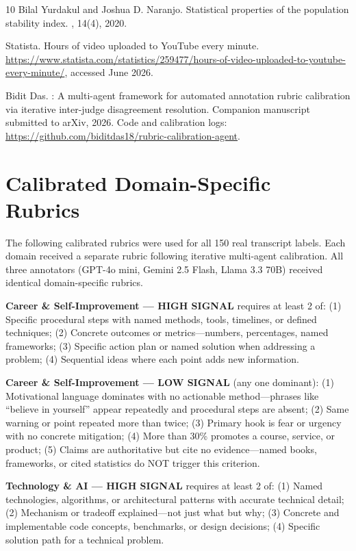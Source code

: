 \documentclass[11pt,a4paper]{article}
\begin{document}
\begin{thebibliography}{10}
Bilal Yurdakul and Joshua D. Naranjo.
\newblock Statistical properties of the population stability index.
, 14(4), 2020.

Statista.
\newblock Hours of video uploaded to YouTube every minute.
\newblock \url{https://www.statista.com/statistics/259477/hours-of-video-uploaded-to-youtube-every-minute/}, accessed June 2026.

Bidit Das.
: A multi-agent framework for automated annotation rubric calibration via iterative inter-judge disagreement resolution.
\newblock Companion manuscript submitted to arXiv, 2026. Code and calibration logs: \url{https://github.com/biditdas18/rubric-calibration-agent}.

\end{thebibliography}

\appendix

\section{Calibrated Domain-Specific Rubrics}
\label{app:rubrics}

The following calibrated rubrics were used for all 150 real transcript labels. Each domain
received a separate rubric following iterative multi-agent calibration. All three annotators
(GPT-4o mini, Gemini 2.5 Flash, Llama 3.3 70B) received identical domain-specific rubrics.

\textbf{Career \& Self-Improvement --- HIGH SIGNAL} requires at least 2 of: (1) Specific
procedural steps with named methods, tools, timelines, or defined techniques; (2) Concrete
outcomes or metrics---numbers, percentages, named frameworks; (3) Specific action plan or named
solution when addressing a problem; (4) Sequential ideas where each point adds new information.

\textbf{Career \& Self-Improvement --- LOW SIGNAL} (any one dominant): (1) Motivational
language dominates with no actionable method---phrases like ``believe in yourself'' appear
repeatedly and procedural steps are absent; (2) Same warning or point repeated more than twice;
(3) Primary hook is fear or urgency with no concrete mitigation; (4) More than 30\% promotes a
course, service, or product; (5) Claims are authoritative but cite no evidence---named books,
frameworks, or cited statistics do NOT trigger this criterion.

\textbf{Technology \& AI --- HIGH SIGNAL} requires at least 2 of: (1) Named technologies,
algorithms, or architectural patterns with accurate technical detail; (2) Mechanism or tradeoff
explained---not just what but why; (3) Concrete and implementable code concepts, benchmarks, or
design decisions; (4) Specific solution path for a technical problem.
\end{document}
